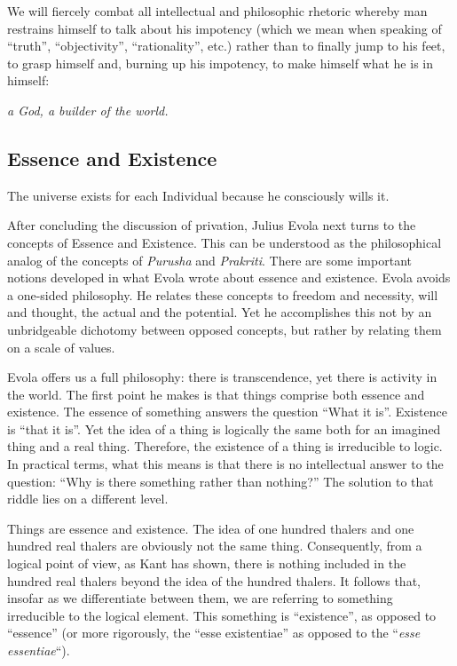 \begin{quotex}
We will fiercely combat all intellectual and philosophic rhetoric whereby man restrains himself to talk about his impotency (which we mean when speaking of ``truth'', ``objectivity'', ``rationality'', etc.) rather than to finally jump to his feet, to grasp himself and, burning up his impotency, to make himself what he is in himself:

\begin{center}\textit{a God, a builder of the world.}\end{center}
\end{quotex}


\subsection*{Essence and Existence}

\begin{quotex}
The universe exists for each Individual because he consciously wills it.

\end{quotex}


After concluding the discussion of privation, Julius Evola next turns to the concepts of Essence and Existence. This can be understood as the philosophical analog of the concepts of \emph{Purusha} and
\emph{Prakriti}. There are some important notions developed in what Evola wrote about essence and existence. Evola avoids a one-sided philosophy. He relates these concepts to freedom and necessity, will and thought, the actual and the potential. Yet he accomplishes this not by an unbridgeable dichotomy between opposed concepts, but rather by relating them on a scale of values.

Evola offers us a full philosophy: there is transcendence, yet there is activity in the world. The first point he makes is that things comprise both essence and existence. The essence of something answers the question ``What it is''. Existence is ``that it is''. Yet the idea of a thing is logically the same both for an imagined thing and a real thing. Therefore, the existence of a thing is irreducible to logic. In practical terms, what this means is that there is no intellectual answer to the question: ``Why is there something rather than nothing?'' The solution to that riddle lies on a different level.

\begin{quotex}
Things are essence and existence. The idea of one hundred thalers and one hundred real thalers are obviously not the same thing. Consequently, from a logical point of view, as Kant has shown, there is nothing included in the hundred real thalers beyond the idea of the hundred thalers. It follows that, insofar as we differentiate between them, we are referring to something irreducible to the logical element. This something is ``existence'', as opposed to ``essence'' (or more rigorously, the ``esse existentiae'' as opposed to the ``\emph{esse essentiae}``).
\end{quotex}


